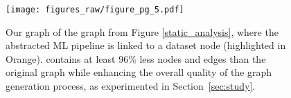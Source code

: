 \begin{figure}
\ncp
 \centering
  \texttt{[image: figures\_raw/figure\_pg\_5.pdf]}
  \ncp\ncp\ncp\ncp\ncp\ncp
  \caption{Our {\GML} graph of the graph from Figure \ref{static_analysis}, where the abstracted ML pipeline is linked to a dataset node (highlighted in Orange). {\GML} contains at least 96\% less nodes and edges than the original graph while enhancing the overall quality of the graph generation process, as experimented in Section~\ref{sec:study}.  
  }
  \ncp\ncp\ncp\ncp\ncp\ncp\ncp
  \label{abstraction_figure}
\end{figure}
